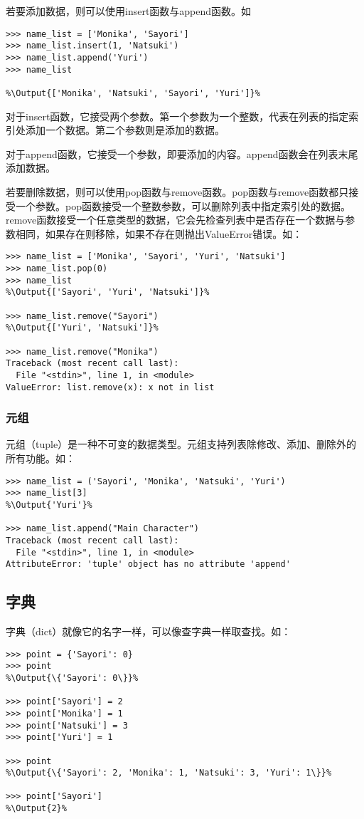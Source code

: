 若要添加数据，则可以使用insert函数与append函数。如
\begin{lstlisting}
>>> name_list = ['Monika', 'Sayori']
>>> name_list.insert(1, 'Natsuki')
>>> name_list.append('Yuri')
>>> name_list

%\Output{['Monika', 'Natsuki', 'Sayori', 'Yuri']}%
\end{lstlisting}

对于insert函数，它接受两个参数。第一个参数为一个整数，代表在列表的指定索引处添加一个数据。第二个参数则是添加的数据。

对于append函数，它接受一个参数，即要添加的内容。append函数会在列表末尾添加数据。

若要删除数据，则可以使用pop函数与remove函数。pop函数与remove函数都只接受一个参数。pop函数接受一个整数参数，可以删除列表中指定索引处的数据。remove函数接受一个任意类型的数据，它会先检查列表中是否存在一个数据与参数相同，如果存在则移除，如果不存在则抛出ValueError错误。如：
\begin{lstlisting}
>>> name_list = ['Monika', 'Sayori', 'Yuri', 'Natsuki']
>>> name_list.pop(0)
>>> name_list
%\Output{['Sayori', 'Yuri', 'Natsuki']}%

>>> name_list.remove("Sayori")
%\Output{['Yuri', 'Natsuki']}%

>>> name_list.remove("Monika")
Traceback (most recent call last):
  File "<stdin>", line 1, in <module>
ValueError: list.remove(x): x not in list
\end{lstlisting}

\subsubsection{元组}
元组（tuple）是一种不可变的数据类型。元组支持列表除修改、添加、删除外的所有功能。如：
\begin{lstlisting}
>>> name_list = ('Sayori', 'Monika', 'Natsuki', 'Yuri')
>>> name_list[3]
%\Output{'Yuri'}%

>>> name_list.append("Main Character")
Traceback (most recent call last):
  File "<stdin>", line 1, in <module>
AttributeError: 'tuple' object has no attribute 'append'
\end{lstlisting}

\subsection{字典}
字典（dict）就像它的名字一样，可以像查字典一样取查找。如：
\begin{lstlisting}
>>> point = {'Sayori': 0}
>>> point
%\Output{\{'Sayori': 0\}}%

>>> point['Sayori'] = 2
>>> point['Monika'] = 1
>>> point['Natsuki'] = 3
>>> point['Yuri'] = 1

>>> point
%\Output{\{'Sayori': 2, 'Monika': 1, 'Natsuki': 3, 'Yuri': 1\}}%

>>> point['Sayori']
%\Output{2}%
\end{lstlisting}

